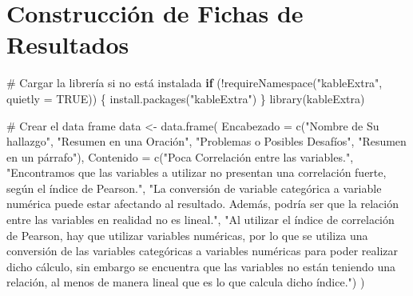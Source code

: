 \documentclass[
  letterpaper,
  DIV=11,
  numbers=noendperiod]{scrreprt}
\newenvironment{Shaded}{\begin{snugshade}}{\end{snugshade}}
\newcommand{\AttributeTok}[1]{\textcolor[rgb]{0.40,0.45,0.13}{#1}}
\newcommand{\CommentTok}[1]{\textcolor[rgb]{0.37,0.37,0.37}{#1}}
\newcommand{\ConstantTok}[1]{\textcolor[rgb]{0.56,0.35,0.01}{#1}}
\newcommand{\ControlFlowTok}[1]{\textcolor[rgb]{0.00,0.23,0.31}{\textbf{#1}}}
\newcommand{\FunctionTok}[1]{\textcolor[rgb]{0.28,0.35,0.67}{#1}}
\newcommand{\NormalTok}[1]{\textcolor[rgb]{0.00,0.23,0.31}{#1}}
\newcommand{\OtherTok}[1]{\textcolor[rgb]{0.00,0.23,0.31}{#1}}
\newcommand{\SpecialCharTok}[1]{\textcolor[rgb]{0.37,0.37,0.37}{#1}}
\newcommand{\StringTok}[1]{\textcolor[rgb]{0.13,0.47,0.30}{#1}}
\begin{document}
\section{Construcción de Fichas de
Resultados}\label{construcciuxf3n-de-fichas-de-resultados}

\begin{Shaded}
\begin{Highlighting}[]
\CommentTok{\# Cargar la librería si no está instalada}
\ControlFlowTok{if}\NormalTok{ (}\SpecialCharTok{!}\FunctionTok{requireNamespace}\NormalTok{(}\StringTok{"kableExtra"}\NormalTok{, }\AttributeTok{quietly =} \ConstantTok{TRUE}\NormalTok{)) \{}
  \FunctionTok{install.packages}\NormalTok{(}\StringTok{"kableExtra"}\NormalTok{)}
\NormalTok{\}}
\FunctionTok{library}\NormalTok{(kableExtra)}

\CommentTok{\# Crear el data frame}
\NormalTok{data }\OtherTok{\textless{}{-}} \FunctionTok{data.frame}\NormalTok{(}
  \AttributeTok{Encabezado =} \FunctionTok{c}\NormalTok{(}\StringTok{"Nombre de Su hallazgo"}\NormalTok{, }
                 \StringTok{"Resumen en una Oración"}\NormalTok{, }
                 \StringTok{"Problemas o Posibles Desafíos"}\NormalTok{, }
                 \StringTok{"Resumen en un párrafo"}\NormalTok{),}
  \AttributeTok{Contenido =} \FunctionTok{c}\NormalTok{(}\StringTok{"Poca Correlación entre las variables."}\NormalTok{, }
                \StringTok{"Encontramos que las variables a utilizar no presentan una correlación fuerte, según el índice de Pearson."}\NormalTok{, }
                \StringTok{"La conversión de variable categórica a variable numérica puede estar afectando al resultado. Además, podría ser que la relación entre las variables en realidad no es lineal."}\NormalTok{, }
                \StringTok{"Al utilizar el índice de correlación de Pearson, hay que utilizar variables numéricas, por lo que se utiliza una conversión de las variables categóricas a variables numéricas para poder realizar dicho cálculo, sin embargo se encuentra que las variables no están teniendo una relación, al menos de manera lineal que es lo que calcula dicho índice."}\NormalTok{)}
\NormalTok{)}


\end{Highlighting}
\end{Shaded}
\end{document}
